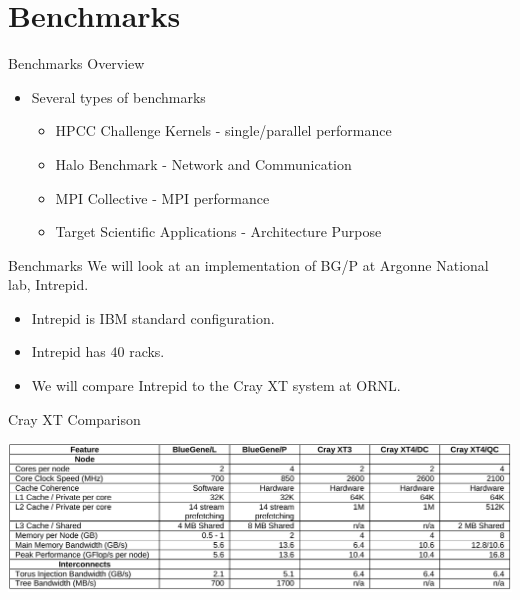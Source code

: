 \documentclass{beamer}
\begin{document}
\section{Benchmarks}
\begin{frame}{Benchmarks Overview}
\begin{itemize}
\item Several types of benchmarks
\begin{itemize}
\item HPCC Challenge Kernels - single/parallel performance
\item Halo Benchmark - Network and Communication
\item MPI Collective - MPI performance
\item Target Scientific Applications - Architecture Purpose
\end{itemize}
\end{itemize}
\end{frame}

\begin{frame}{Benchmarks}
We will look at an implementation of BG/P at Argonne National lab, Intrepid.
\begin{itemize}
\item Intrepid is IBM standard configuration.
\item Intrepid has $40$ racks.  
\item We will compare Intrepid to the Cray XT system at ORNL.
\end{itemize}
\end{frame}

\begin{frame}{Cray XT Comparison}
\begin{center}
\includegraphics[scale=0.33]{figs/xt.png}
\end{center}
\end{frame}
\end{document}
